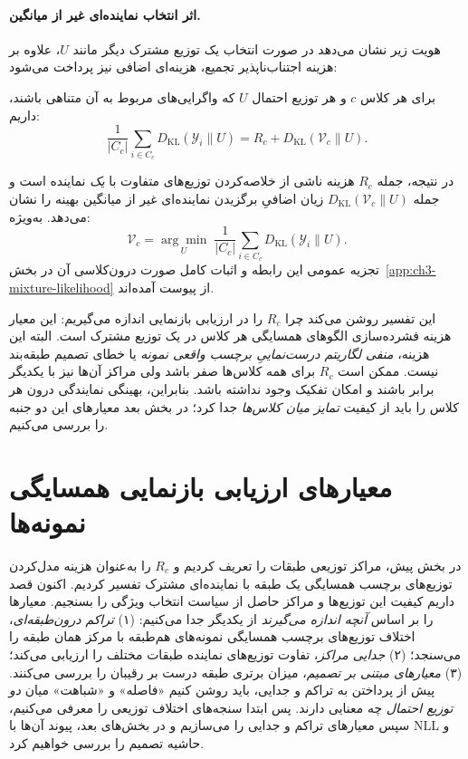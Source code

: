 \paragraph{اثر انتخاب نماینده‌ای غیر از میانگین.}
هویت زیر نشان می‌دهد در صورت انتخاب یک توزیع مشترک دیگر مانند $U$، علاوه بر هزینه اجتناب‌ناپذیر تجمیع، هزینه‌ای اضافی نیز پرداخت می‌شود:
\begin{theorem}\label{thm:ch3-KL-decomposition}
برای هر کلاس $c$ و هر توزیع احتمال $U$ که واگرایی‌های مربوط به آن متناهی باشند، داریم:
\begin{equation}\label{eq:ch3-KL-decomposition}
\boxed{
\frac{1}{|C_c|}\sum_{i\in C_c}
D_{\mathrm{KL}}(\mathscr Y_i\|U)
=R_c+D_{\mathrm{KL}}(\mathcal V_c\|U).}
\end{equation}
\end{theorem}
در نتیجه، جمله $R_c$ هزینه ناشی از خلاصه‌کردن توزیع‌های متفاوت با \emph{یک} نماینده است و جمله $D_{\mathrm{KL}}(\mathcal V_c\|U)$ زیان اضافیِ برگزیدن نماینده‌ای غیر از میانگین بهینه را نشان می‌دهد. به‌ویژه:
\begin{equation}\label{eq:ch3-KL-opt-center}
\boxed{\mathcal V_c=
\underset{U}{\arg\min}\;
\frac{1}{|C_c|}\sum_{i\in C_c}
D_{\mathrm{KL}}(\mathscr Y_i\|U).}
\end{equation}
تجزیه عمومی این رابطه و اثبات کامل صورت درون‌کلاسی آن در بخش~\ref{app:ch3-mixture-likelihood} از پیوست آمده‌اند.

این تفسیر روشن می‌کند چرا $R_c$ را در ارزیابی بازنمایی اندازه می‌گیریم: این معیار هزینه فشرده‌سازی الگوهای همسایگی هر کلاس در یک توزیع مشترک است. البته این هزینه، \emph{منفی لگاریتم درست‌نماییِ برچسب واقعی نمونه} یا خطای تصمیم طبقه‌بند نیست. ممکن است $R_c$ برای همه کلاس‌ها صفر باشد ولی مراکز آن‌ها نیز با یکدیگر برابر باشند و امکان تفکیک وجود نداشته باشد. بنابراین، بهینگی نمایندگی درون هر کلاس را باید از کیفیت \emph{تمایز میان کلاس‌ها} جدا کرد؛ در بخش بعد معیارهای این دو جنبه را بررسی می‌کنیم.


\section{معیارهای ارزیابی بازنمایی همسایگی نمونه‌ها}
\label{sec:ch3-quality-criteria}

در بخش پیش، مراکز توزیعی طبقات را تعریف کردیم
و $R_c$ را به‌عنوان هزینه مدل‌کردن توزیع‌های
برچسب همسایگی یک طبقه با نماینده‌ای مشترک
تفسیر کردیم. اکنون قصد داریم کیفیت این
توزیع‌ها و مراکز حاصل از سیاست انتخاب ویژگی
را بسنجیم. معیارها را بر اساس \emph{آنچه
اندازه می‌گیرند} از یکدیگر جدا می‌کنیم:
(۱) \emph{تراکم درون‌طبقه‌ای}، اختلاف
توزیع‌های برچسب همسایگی نمونه‌های هم‌طبقه
با مرکز همان طبقه را می‌سنجد؛
(۲) \emph{جدایی مراکز}، تفاوت توزیع‌های
نماینده طبقات مختلف را ارزیابی می‌کند؛
(۳) \emph{معیارهای مبتنی بر تصمیم}، میزان
برتری طبقه درست بر رقیبان را بررسی می‌کنند.
پیش از پرداختن به تراکم و جدایی، باید
روشن کنیم «فاصله» و «شباهت» میان
\emph{دو توزیع احتمال} چه معنایی دارند.
پس ابتدا سنجه‌های اختلاف توزیعی را معرفی
می‌کنیم، سپس معیارهای تراکم و جدایی
را می‌سازیم و در بخش‌های بعد،
پیوند آن‌ها با NLL و حاشیه تصمیم را
بررسی خواهیم کرد.

